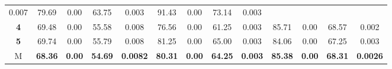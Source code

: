 \begin{table}[H]
{\begin{tabular}{ccccccccccccc}
		\multicolumn{1}{c|}{0.007} &
		\multicolumn{1}{c|}{79.69} &
		\multicolumn{1}{c|}{0.00} &
		\multicolumn{1}{c|}{63.75} &
		\multicolumn{1}{c|}{0.003} &
		\multicolumn{1}{c|}{91.43} &
		\multicolumn{1}{c|}{0.00} &
		\multicolumn{1}{c|}{73.14} &
		\multicolumn{1}{c|}{0.003} \\ \cline{2-13} 
		\multicolumn{1}{c|}{\cellcolor[HTML]{C0C0C0}\textbf{4}} &
		\multicolumn{1}{c|}{69.48} &
		\multicolumn{1}{c|}{0.00} &
		\multicolumn{1}{c|}{55.58} &
		\multicolumn{1}{c|}{0.008} &
		\multicolumn{1}{c|}{76.56} &
		\multicolumn{1}{c|}{0.00} &
		\multicolumn{1}{c|}{61.25} &
		\multicolumn{1}{c|}{0.003} &
		\multicolumn{1}{c|}{85.71} &
		\multicolumn{1}{c|}{0.00} &
		\multicolumn{1}{c|}{68.57} &
		\multicolumn{1}{c|}{0.002} \\ \cline{2-13} 
		\multicolumn{1}{c|}{\cellcolor[HTML]{C0C0C0}\textbf{5}} &
		\multicolumn{1}{c|}{69.74} &
		\multicolumn{1}{c|}{0.00} &
		\multicolumn{1}{c|}{55.79} &
		\multicolumn{1}{c|}{0.008} &
		\multicolumn{1}{c|}{81.25} &
		\multicolumn{1}{c|}{0.00} &
		\multicolumn{1}{c|}{65.00} &
		\multicolumn{1}{c|}{0.003} &
		\multicolumn{1}{c|}{84.06} &
		\multicolumn{1}{c|}{0.00} &
		\multicolumn{1}{c|}{67.25} &
		\multicolumn{1}{c|}{0.003} \\ \cline{2-13} 
		\multicolumn{1}{c|}{\cellcolor[HTML]{FFFE65}M} &
		\multicolumn{1}{c|}{\textbf{68.36}} &
		\multicolumn{1}{c|}{\textbf{0.00}} &
		\multicolumn{1}{c|}{\textbf{54.69}} &
		\multicolumn{1}{c|}{\textbf{0.0082}} &
		\multicolumn{1}{c|}{\textbf{80.31}} &
		\multicolumn{1}{c|}{\textbf{0.00}} &
		\multicolumn{1}{c|}{\textbf{64.25}} &
		\multicolumn{1}{c|}{\textbf{0.003}} &
		\multicolumn{1}{c|}{\textbf{85.38}} &
		\multicolumn{1}{c|}{\textbf{0.00}} &
		\multicolumn{1}{c|}{\textbf{68.31}} &
		\multicolumn{1}{c|}{\textbf{0.0026}} \\ \cline{2-13} 
	\end{tabular}
}
\end{table}
